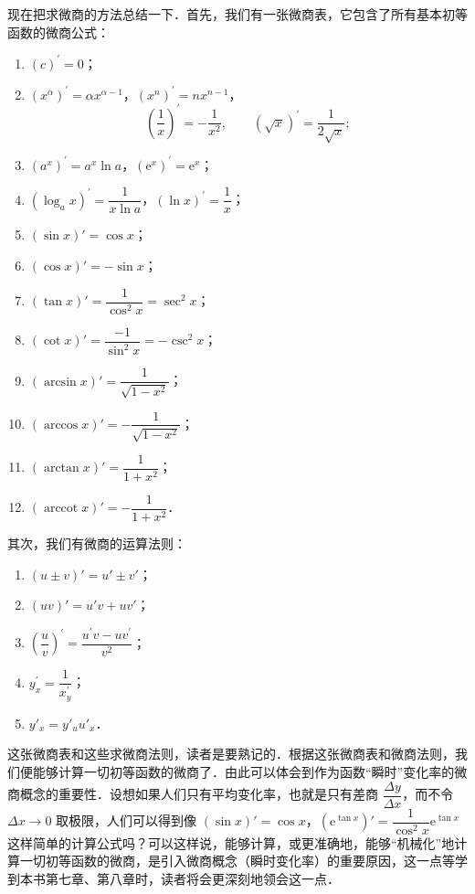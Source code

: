 现在把求微商的方法总结一下．首先，我们有一张微商表，它包含了所有基本初等函数的微商公式：
\begin{enumerate}[(1)]
\item $\left(c\right)^{\prime} = 0$；
\item $\left(x^{\alpha}\right)^{\prime} = \alpha x^{\alpha-1}$，$\left(x^n\right)^{\prime} = nx^{n-1}$，
\[
\left(\frac{1}{x}\right)^{\prime} = -\frac{1}{x^{2}},\qquad\left(\sqrt{x}\right)^{\prime} = \frac{1}{2\sqrt{x}};
\]
\item $\left(a^x\right)^{\prime} = a^x\ln a$，$\left(\mathrm{e}^x\right)^{\prime} = \mathrm{e}^x$；
\item $\left(\log_{a}x\right)^{\prime} = \dfrac{1}{x\ln a}$，$\left(\ln x\right)^{\prime} = \dfrac{1}{x}$；
\item $\left(\sin x\right)' = \cos x$；
\item $\left(\cos x\right)' = -\sin x$；
\item $\left(\tan x\right)' = \dfrac{1}{\cos^2 x} = \sec^2 x$；
\item $\left(\cot x\right)' = \dfrac{-1}{\sin^2 x} = -\csc^2 x$；
\item $\left(\arcsin x\right)' = \dfrac{1}{\sqrt{1 - x^2}}$；
\item $\left(\arccos x\right)' = -\dfrac{1}{\sqrt{1 - x^2}}$；
\item $\left(\arctan x\right)' = \dfrac{1}{1 + x^2}$；
\item $\left(\operatorname{arccot} x\right)' = -\dfrac{1}{1 + x^2}$．
\end{enumerate}

其次，我们有微商的运算法则：
\begin{enumerate}[(1)]
\item $\left(u \pm v\right)' = u' \pm v'$；
\item $\left(uv\right)' = u'v + uv'$；
\item $\left(\dfrac{u}{v}\right)^{\prime} = \dfrac{u^{\prime}v - uv^{\prime}}{v^{2}}$；
\item $y_{x}^{\prime} = \dfrac{1}{x_{y}^{\prime}}$；
\item $y'_{x} = y'_{u} u'_{x}$．
\end{enumerate}

这张微商表和这些求微商法则，读者是要熟记的．根据这张微商表和微商法则，我们便能够计算一切初等函数的微商了．由此可以体会到作为函数``瞬时''变化率的微商概念的重要性．设想如果人们只有平均变化率，也就是只有差商 $\dfrac{\Delta y}{\Delta x}$，而不令 $\Delta x \to 0$ 取极限，人们可以得到像 $\left(\sin x\right)' = \cos x$，$\left(\mathrm{e}^{\tan x}\right)' = \dfrac{1}{\cos^2 x}\mathrm{e}^{\tan x}$ 这样简单的计算公式吗？可以这样说，能够计算，或更准确地，能够``机械化''地计算一切初等函数的微商，是引入微商概念（瞬时变化率）的重要原因，这一点等学到本书第七章、第八章时，读者将会更深刻地领会这一点．

